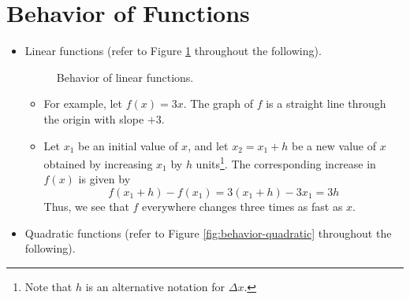 \documentclass[../main.tex]{subfiles}
\begin{document}
\section{Behavior of Functions}
\begin{itemize}
    \item Linear functions (refer to Figure \ref{fig:behavior-linear} throughout the following).
    \begin{figure}[h!]
        \centering
        \caption{Behavior of linear functions.}
        \label{fig:behavior-linear}
    \end{figure}
    \begin{itemize}
        \item For example, let $f(x)=3x$. The graph of $f$ is a straight line through the origin with slope $+3$.
        \item Let $x_1$ be an initial value of $x$, and let $x_2=x_1+h$ be a new value of $x$ obtained by increasing $x_1$ by $h$ units\footnote{Note that $h$ is an alternative notation for $\Delta x$.}. The corresponding increase in $f(x)$ is given by
        \begin{equation*}
            f(x_1+h)-f(x_1) = 3(x_1+h)-3x_1
            = 3h
        \end{equation*}
        Thus, we see that $f$ everywhere changes three times as fast as $x$.
    \end{itemize}
    \item Quadratic functions (refer to Figure \ref{fig:behavior-quadratic} throughout the following).
    \begin{figure}[h!]
        \centering
\end{figure}
\end{itemize}
\end{document}
